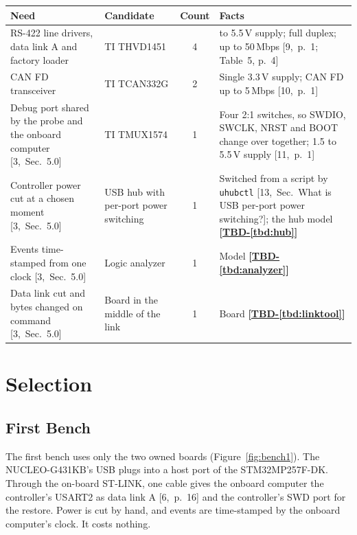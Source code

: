 \documentclass[11pt,a4paper]{article}
\newcommand{\tbd}[1]{\mbox{\textbf{[\hyperref[tbd:#1]{TBD-\ref*{tbd:#1}}]}}}
\begin{document}
\smallskip
{\small\noindent\begin{tabularx}{\textwidth}{@{}>{\raggedright\arraybackslash}p{3.6cm}>{\raggedright\arraybackslash}p{2.6cm}c>{\raggedright\arraybackslash}X@{}}
\toprule
Need & Candidate & Count & Facts \\
\midrule
RS-422 line drivers, data link A and factory loader & TI THVD1451 & 4 & 3 to 5.5\,V supply; full duplex; up to 50\,Mbps [9,~p.~1; Table~5, p.~4] \\
CAN FD transceiver & TI TCAN332G & 2 & Single 3.3\,V supply; CAN FD up to 5\,Mbps [10,~p.~1] \\
Debug port shared by the probe and the onboard computer [3,~Sec.~5.0] & TI TMUX1574 & 1 & Four 2:1 switches, so SWDIO, SWCLK, NRST and BOOT change over together; 1.5 to 5.5\,V supply [11,~p.~1] \\
Controller power cut at a chosen moment [3,~Sec.~5.0] & USB hub with per-port power switching & 1 & Switched from a script by \texttt{uhubctl} [13,~Sec.~What is USB per-port power switching?]; the hub model \tbd{hub} \\
Events time-stamped from one clock [3,~Sec.~5.0] & Logic analyzer & 1 & Model \tbd{analyzer} \\
Data link cut and bytes changed on command [3,~Sec.~5.0] & Board in the middle of the link & 1 & Board \tbd{linktool} \\
\bottomrule
\end{tabularx}}

\section{Selection}

\subsection{First Bench}
The first bench uses only the two owned boards (Figure~\ref{fig:bench1}). The
NUCLEO-G431KB's USB plugs into a host port of the STM32MP257F-DK. Through the
on-board ST-LINK, one cable gives the onboard computer the controller's USART2
as data link A [6,~p.~16] and the controller's SWD port for the restore. Power
is cut by hand, and events are time-stamped by the onboard computer's clock.
It costs nothing.
\end{document}

